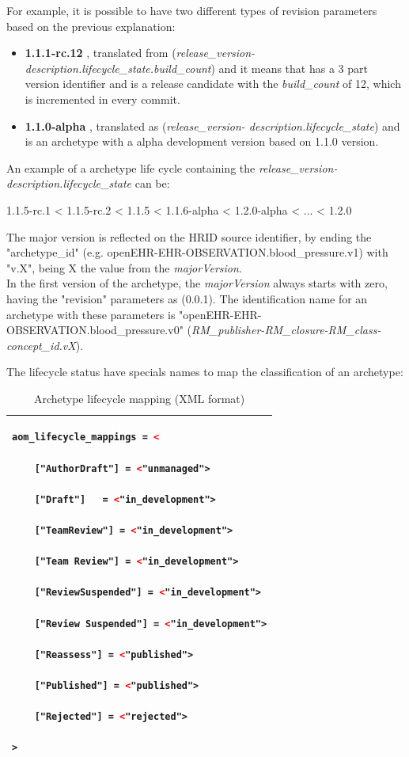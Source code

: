 \documentclass[mim_thesis.tex]{subfiles}
\begin{document}
For example, it is possible to have two different types of revision parameters based on the previous explanation:

\begin{itemize}
\item \textbf{1.1.1-rc.12} , translated from (\textit{release\_version-description.lifecycle\_state.build\_count}) and it means that has a 3 part version identifier and is a release candidate with the \textit{build\_count} of 12, which is incremented in every commit.
\item \textbf{1.1.0-alpha} , translated as (\textit{release\_version- description.lifecycle\_state}) and is an archetype with a alpha development version based on 1.1.0 version. 
\end{itemize}

An example of a archetype life cycle containing the \textit{release\_version-description.lifecycle\_state} can be: 
\begin{center}
{1.1.5-rc.1 < 1.1.5-rc.2 < 1.1.5 < 1.1.6-alpha < 1.2.0-alpha < ... < 1.2.0}
\end{center}

The major version is reflected on the HRID source identifier, by ending the "archetype\_id" (e.g. openEHR-EHR-OBSERVATION.blood\_pressure.v1) with "v.X", being X the value from the \textit{majorVersion}. \\

In the first version of the archetype, the  \textit{majorVersion} always starts with zero, having the "revision" parameters as (0.0.1). The identification name for an archetype with these parameters is "openEHR-EHR-OBSERVATION.blood\_pressure.v0" (\textit{RM\_publisher-RM\_closure-RM\_class-concept\_id.vX}).

\newpage
The lifecycle status have specials names to map the classification of an archetype:
\begin{table}[H]
\caption{Archetype lifecycle mapping (XML format)}
\label{tab:arch_lifecycle_xml}
\centering
\begin{tabular}{l}
\toprule[2pt]
\begin{lstlisting}[language=XML]
aom_lifecycle_mappings = <

	["AuthorDraft"] = <"unmanaged">
    
	["Draft"]	= <"in_development">
    
	["TeamReview"] = <"in_development">
    
	["Team Review"] = <"in_development">
    
	["ReviewSuspended"] = <"in_development">
    
	["Review Suspended"] = <"in_development">
    
	["Reassess"] = <"published">
    
	["Published"] = <"published">
    
	["Rejected"] = <"rejected">

>
\end{lstlisting}
\tabularnewline \bottomrule[2pt]
\end{tabular}
\end{table}
\end{document}
